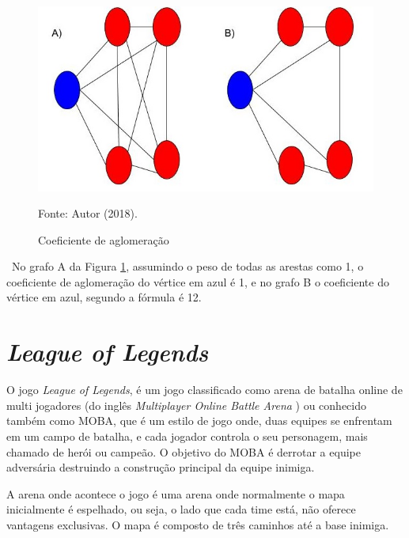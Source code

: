 \

\begin{figure}[!ht]
	\caption{Coeficiente de aglomeração}
	\begin{center}
		\includegraphics[width=15cm]{imagens/figura_grafos}
	\end{center}
	\small{Fonte: Autor (2018).}
	\label{fig:grafos}
\end{figure}

\
	No grafo A da Figura \ref{fig:grafos}, assumindo o peso de todas as arestas como 1, o coeficiente de aglomeração do vértice em azul é 1, e no grafo B o coeficiente do vértice em azul, segundo a fórmula é 12. 
    


\section{\textit{League of Legends}}
\label{chap:lol}
O jogo \textit{League of Legends}, é um jogo classificado como arena de batalha online de multi jogadores (do inglês \textit{Multiplayer Online Battle Arena} ) ou conhecido também como MOBA, que é um estilo de jogo onde, duas equipes se enfrentam em um campo de batalha, e cada jogador controla o seu personagem, mais chamado de herói ou campeão. O objetivo do MOBA é derrotar a equipe adversária destruindo a construção principal da equipe inimiga.

	A arena onde acontece o jogo é uma arena onde normalmente o mapa inicialmente é  espelhado,  ou  seja, o lado que cada time está,  não  oferece vantagens  exclusivas.  O mapa é composto  de  três caminhos até a base inimiga.
    

